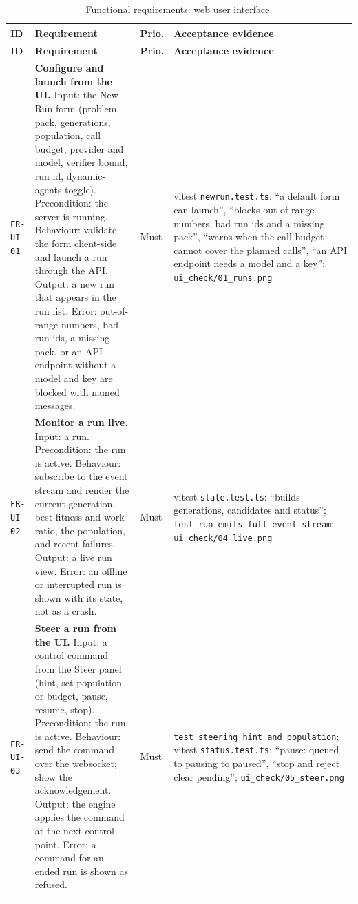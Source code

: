\begin{longtable}{@{}>{\raggedright\arraybackslash}p{}>{\raggedright\arraybackslash}p{}p{}>{\raggedright\arraybackslash}p{}@{}}
\caption{Functional requirements: web user interface.}\label{tab:fr-ui}\\
\toprule
\textbf{ID} & \textbf{Requirement} & \textbf{Prio.} & \textbf{Acceptance evidence} \\
\midrule
\endfirsthead
\toprule
\textbf{ID} & \textbf{Requirement} & \textbf{Prio.} & \textbf{Acceptance evidence} \\
\midrule
\endhead
\bottomrule
\endfoot

\texttt{FR-UI-01} & \textbf{Configure and launch from the UI.} Input: the New
Run form (problem pack, generations, population, call budget, provider and
model, verifier bound, run id, dynamic-agents toggle). Precondition: the server
is running. Behaviour: validate the form client-side and launch a run through
the API. Output: a new run that appears in the run list. Error: out-of-range
numbers, bad run ids, a missing pack, or an API endpoint without a model and key
are blocked with named messages. & Must & vitest \texttt{newrun.test.ts}:
``a default form can launch'', ``blocks out-of-range numbers, bad run ids and a
missing pack'', ``warns when the call budget cannot cover the planned calls'',
``an API endpoint needs a model and a key''; \texttt{ui\_check/01\_runs.png} \\
\addlinespace[2pt]

\texttt{FR-UI-02} & \textbf{Monitor a run live.} Input: a run. Precondition: the
run is active. Behaviour: subscribe to the event stream and render the current
generation, best fitness and work ratio, the population, and recent failures.
Output: a live run view. Error: an offline or interrupted run is shown with its
state, not as a crash. & Must & vitest \texttt{state.test.ts}: ``builds
generations, candidates and status''; \texttt{test\_run\_emits\_full\_event\_stream};
\texttt{ui\_check/04\_live.png} \\
\addlinespace[2pt]

\texttt{FR-UI-03} & \textbf{Steer a run from the UI.} Input: a control command
from the Steer panel (hint, set population or budget, pause, resume, stop).
Precondition: the run is active. Behaviour: send the command over the websocket;
show the acknowledgement. Output: the engine applies the command at the next
control point. Error: a command for an ended run is shown as refused. & Must &
\texttt{test\_steering\_hint\_and\_population}; vitest \texttt{status.test.ts}:
``pause: queued to pausing to paused'', ``stop and reject clear pending'';
\texttt{ui\_check/05\_steer.png} \\
\addlinespace[2pt]


\end{longtable}
